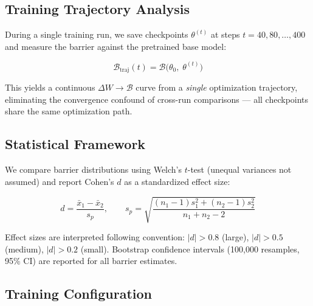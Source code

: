 \documentclass[11pt,a4paper]{article}
\begin{document}
\subsection{Training Trajectory Analysis}

During a single training run, we save checkpoints $\theta^{(t)}$ at steps $t = 40, 80, \dots, 400$ and measure the barrier against the pretrained base model:

\begin{equation}\label{eq:traj}
\mathcal{B}_{\text{traj}}(t) = \mathcal{B}\big(\theta_0,\; \theta^{(t)}\big)
\end{equation}

This yields a continuous $\Delta W \to \mathcal{B}$ curve from a \emph{single} optimization trajectory, eliminating the convergence confound of cross-run comparisons — all checkpoints share the same optimization path.

\subsection{Statistical Framework}

We compare barrier distributions using Welch's $t$-test (unequal variances not assumed) and report Cohen's $d$ as a standardized effect size:

\begin{equation}\label{eq:cohensd}
d = \frac{\bar{x}_1 - \bar{x}_2}{s_p}, \qquad
s_p = \sqrt{\frac{(n_1 - 1)s_1^2 + (n_2 - 1)s_2^2}{n_1 + n_2 - 2}}
\end{equation}

Effect sizes are interpreted following convention: $|d| > 0.8$ (large), $|d| > 0.5$ (medium), $|d| > 0.2$ (small). Bootstrap confidence intervals (100,000 resamples, 95\% CI) are reported for all barrier estimates.

\subsection{Training Configuration}
\end{document}
